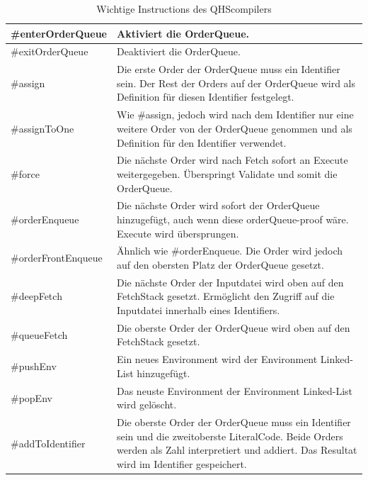 \begin{table}[H]
    \centering
    \caption{Wichtige Instructions des QHScompilers}
    \label{tab:important_instructions}
    \vspace{3mm} %
    
    \begin{tabularx}{\textwidth}{l|X}
    \#enterOrderQueue      & Aktiviert die OrderQueue. \\ \hline
    \#exitOrderQueue       & Deaktiviert die OrderQueue. \\ \hline
    \#assign               & Die erste Order der OrderQueue muss ein Identifier sein. Der Rest der Orders auf der OrderQueue wird als Definition für diesen Identifier festgelegt. \\ \hline
    \#assignToOne          & Wie \#assign, jedoch wird nach dem Identifier nur eine weitere Order von der OrderQueue genommen und als Definition für den Identifier verwendet. \\ \hline
    \#force                & Die nächste Order wird nach Fetch sofort an Execute weitergegeben. Überspringt Validate und somit die OrderQueue. \\ \hline
    \#orderEnqueue         & Die nächste Order wird sofort der OrderQueue hinzugefügt, auch wenn diese orderQueue-proof wäre. Execute wird übersprungen. \\ \hline
    \#orderFrontEnqueue    & Ähnlich wie \#orderEnqueue. Die Order wird jedoch auf den obersten Platz der OrderQueue gesetzt. \\ \hline
    \#deepFetch            & Die nächste Order der Inputdatei wird oben auf den FetchStack gesetzt. Ermöglicht den Zugriff auf die Inputdatei innerhalb eines Identifiers. \\ \hline
    \#queueFetch           & Die oberste Order der OrderQueue wird oben auf den FetchStack gesetzt. \\ \hline 
    \#pushEnv              & Ein neues Environment wird der Environment Linked-List hinzugefügt. \\ \hline
    \#popEnv               & Das neuste Environment der Environment Linked-List wird gelöscht. \\ \hline
    \#addToIdentifier      & Die oberste Order der OrderQueue muss ein Identifier sein und die zweitoberste LiteralCode. Beide Orders werden als Zahl interpretiert und addiert.
                                      Das Resultat wird im Identifier gespeichert.       
    \end{tabularx}
\end{table}

